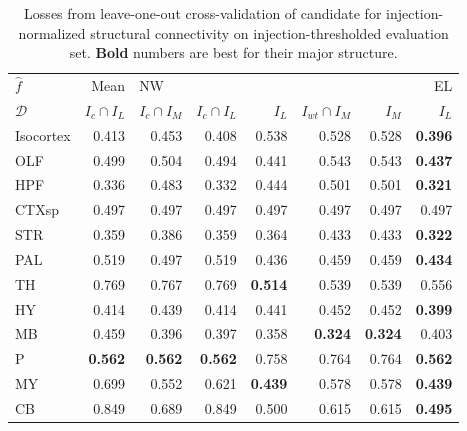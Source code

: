\begin{table}[H]
\begin{tabular}{lrrrrrrr}
\toprule
$\widehat f$ &           Mean & \multicolumn{5}{l}{NW} &     EL \\
$\mathcal D$ & $I_c \cap I_L$ & $I_c \cap I_M$ & $I_c \cap I_L$ &  $I_L$ & $I_{wt} \cap I_M$ &  $I_M$ &  $I_L$ \\
\midrule
Isocortex &          0.413 &          0.453 &          0.408 &  0.538 &             0.528 &  0.528 &  \textbf{0.396} \\
OLF       &          0.499 &          0.504 &          0.494 &  0.441 &             0.543 &  0.543 &  \textbf{0.437} \\
HPF       &          0.336 &          0.483 &          0.332 &  0.444 &             0.501 &  0.501 & \textbf{ 0.321} \\
CTXsp     &          0.497 &          0.497 &          0.497 &  0.497 &             0.497 &  0.497 &  0.497 \\
STR       &          0.359 &          0.386 &          0.359 &  0.364 &             0.433 &  0.433 &\textbf{  0.322} \\
PAL       &          0.519 &          0.497 &          0.519 &  0.436 &             0.459 &  0.459 &\textbf{  0.434} \\
TH        &          0.769 &          0.767 &          0.769 &  \textbf{0.514} &             0.539 &  0.539 &  0.556 \\
HY        &          0.414 &          0.439 &          0.414 &  0.441 &             0.452 &  0.452 & \textbf{ 0.399} \\
MB        &          0.459 &          0.396 &          0.397 &  0.358 &         \textbf{    0.324 }& \textbf{ 0.324 }&  0.403 \\
P         &          \textbf{0.562 }&    \textbf{     0.562 }&      \textbf{    0.562 }&  0.758 &             0.764 &  0.764 &  \textbf{0.562} \\
MY        &          0.699 &          0.552 &          0.621 &  \textbf{0.439 }&             0.578 &  0.578 & \textbf{ 0.439} \\
CB        &          0.849 &          0.689 &          0.849 &  0.500 &             0.615 &  0.615 & \textbf{ 0.495} \\
\bottomrule
\end{tabular}
\caption{Losses from leave-one-out cross-validation of candidate for injection-normalized structural connectivity on injection-thresholded evaluation set. \textbf{Bold} numbers are best for their major structure.} 
\label{tab:eval_size}
\end{table}

